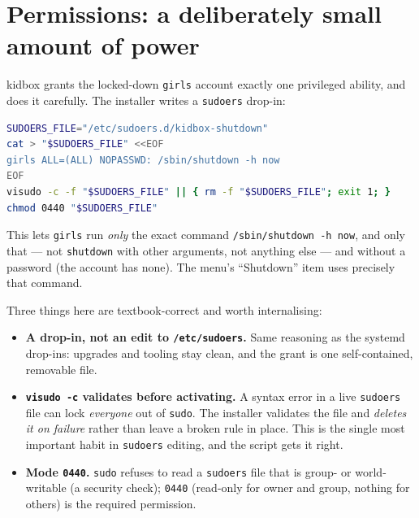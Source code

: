 \documentclass[11pt,oneside]{article}
\newcommand{\code}[1]{\texorpdfstring{\textcolor{kbblue}{\texttt{#1}}}{#1}}
\newcommand{\file}[1]{\textcolor{kbteal}{\texttt{#1}}}
\begin{document}
\section{Permissions: a deliberately small amount of power}

kidbox grants the locked-down \texttt{girls} account exactly one privileged
ability, and does it carefully. The installer writes a \texttt{sudoers} drop-in:

\begin{lstlisting}[language=bash]
SUDOERS_FILE="/etc/sudoers.d/kidbox-shutdown"
cat > "$SUDOERS_FILE" <<EOF
girls ALL=(ALL) NOPASSWD: /sbin/shutdown -h now
EOF
visudo -c -f "$SUDOERS_FILE" || { rm -f "$SUDOERS_FILE"; exit 1; }
chmod 0440 "$SUDOERS_FILE"
\end{lstlisting}

This lets \texttt{girls} run \emph{only} the exact command \code{/sbin/shutdown
-h now}, and only that --- not \code{shutdown} with other arguments, not anything
else --- and without a password (the account has none). The menu's ``Shutdown''
item uses precisely that command.

Three things here are textbook-correct and worth internalising:

\begin{itemize}
\item \textbf{A drop-in, not an edit to \file{/etc/sudoers}.} Same reasoning as
the systemd drop-ins: upgrades and tooling stay clean, and the grant is one
self-contained, removable file.
\item \textbf{\code{visudo -c} validates before activating.} A syntax error in a
live \texttt{sudoers} file can lock \emph{everyone} out of \texttt{sudo}. The
installer validates the file and \emph{deletes it on failure} rather than leave a
broken rule in place. This is the single most important habit in
\texttt{sudoers} editing, and the script gets it right.
\item \textbf{Mode \code{0440}.} \texttt{sudo} refuses to read a
\texttt{sudoers} file that is group- or world-writable (a security check);
\code{0440} (read-only for owner and group, nothing for others) is the required
permission.
\end{itemize}
\end{document}
